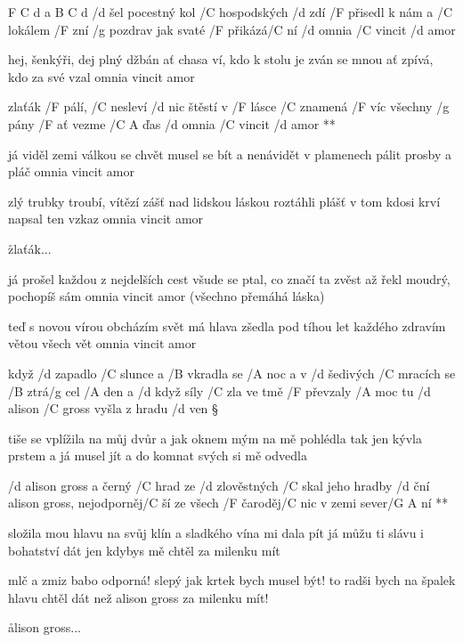 




F C d a B C d
/d šel pocestný kol /C hospodských /d zdí
/F přisedl k nám a /C lokálem /F zní
/g pozdrav jak svaté /F přikázá/C ní
/d omnia /C vincit /d amor \s

hej, šenkýři, dej plný džbán
ať chasa ví, kdo k stolu je zván
se mnou ať zpívá, kdo za své vzal
omnia vincit amor \s

\R zlaťák /F pálí, /C nesleví /d nic
   štěstí v /F lásce /C znamená /F víc
   všechny /g pány /F ať vezme /{C A} ďas
   /d omnia /C vincit /d amor **

já viděl zemi válkou se chvět
musel se bít a nenávidět
v plamenech pálit prosby a pláč
omnia vincit amor \s

zlý trubky troubí, vítězí zášť
nad lidskou láskou roztáhli plášť
v tom kdosi krví napsal ten vzkaz
omnia vincit amor \s

\r zlaťák...

já prošel každou z nejdelších cest
všude se ptal, co značí ta zvěst
až řekl moudrý, pochopíš sám
omnia vincit amor (všechno přemáhá láska) \s

\rr

teď s novou vírou obcházím svět
má hlava zšedla pod tíhou let
každého zdravím větou všech vět
omnia vincit amor




když /d zapadlo /C slunce a /B vkradla se /A noc
a v /d šedivých /C mracích se /B ztrá/g cel /A den
a /d když síly /C zla ve tmě /F převzaly /A moc
tu /d alison /C gross vyšla z hradu /d ven \S

tiše se vplížila na můj dvůr
a jak oknem mým na mě pohlédla
tak jen kývla prstem a já musel jít
a do komnat svých si mě odvedla

\R  /d alison gross a černý /C hrad
    ze /d zlověstných /C skal jeho hradby /d ční
    alison gross, nejodporněj/C ší
    ze všech /F čaroděj/C nic v zemi sever/{G A} ní **

složila mou hlavu na svůj klín
a sladkého vína mi dala pít
já můžu ti slávu i bohatství dát
jen kdybys mě chtěl za milenku mít \s

mlč a zmiz babo odporná!
slepý jak krtek bych musel být!
to radši bych na špalek hlavu chtěl dát
než alison gross za milenku mít!

\r  alison gross...

